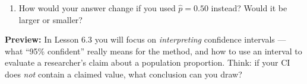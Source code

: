 \documentclass[10pt]{article}
\begin{document}
\begin{enumerate}
\begin{enumerate}[label=\alph*.]
          \item How would your answer change if you used $\hat p = 0.50$ instead? Would it be
                larger or smaller? 
        \end{enumerate}

\end{enumerate}

\begin{reflectionbox}
\textbf{Preview:} In Lesson 6.3 you will focus on \emph{interpreting} confidence intervals ---
what ``95\% confident'' really means for the method, and how to use an interval to evaluate a
researcher's claim about a population proportion. Think: if your CI does \emph{not} contain a
claimed value, what conclusion can you draw?
\end{reflectionbox}
\end{document}
